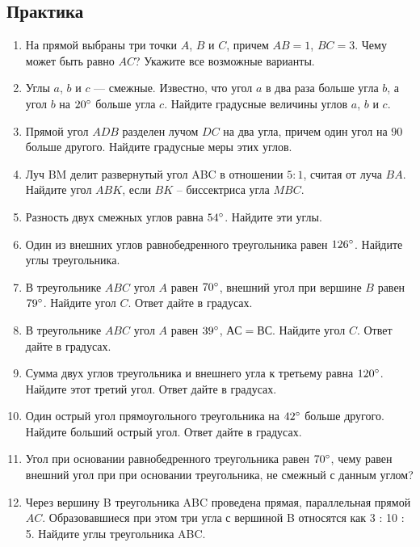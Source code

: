 \documentclass[12pt, a4paper]{article}
\begin{document}
		
	
\subsection*{Практика}	
\begin{enumerate}
	\item На прямой выбраны три точки $A$, $B$ и $C$, причем $AB = 1$, $BC = 3$. Чему может быть равно $AC$? Укажите все возможные варианты.
	\item Углы $a$, $b$ и $c$ — смежные. Известно, что угол $a$ в два раза больше угла $b$, а угол $b$ на $20\degree$ больше угла $c$. Найдите градусные величины углов $a$, $b$ и $c$.
	\item Прямой угол $ADB$ разделен лучом $DC$ на два угла, причем один угол на $90$ больше другого. Найдите градусные меры этих углов.
	\item Луч BM делит развернутый угол ABC в отношении $5:1$, считая от луча $BA$. Найдите угол $ABK$, если $BK$ – биссектриса угла $MBC$.
	\item Разность двух смежных углов равна $54\degree$. Найдите эти углы.
	\item Один из внешних углов равнобедренного треугольника равен $126\degree$. Найдите углы треугольника.
	\item В треугольнике $ABC$ угол $A$ равен $70\degree$, внешний угол при вершине $B$ равен  $79\degree$. Найдите угол $C$. Ответ дайте в градусах.
	\item В треугольнике $ABC$ угол $A$ равен $39\degree$, $АС=ВС$. Найдите угол $C$. Ответ дайте в градусах.
	\item Сумма двух углов треугольника и внешнего угла к третьему равна $120\degree$. Найдите этот третий угол. Ответ дайте в градусах.
	\item Один острый угол прямоугольного треугольника на $42\degree$ больше другого. Найдите больший острый угол. Ответ дайте в градусах.
	\item Угол при основании равнобедренного треугольника равен $70\degree$, чему равен внешний угол при при основании треугольника, не смежный с данным углом?
	\item Через вершину B треугольника ABC проведена прямая, параллельная прямой $AC$. Образовавшиеся при этом три угла с вершиной B относятся как 3 : 10 : 5. Найдите углы треугольника ABC.
\end{enumerate}
\end{document}

